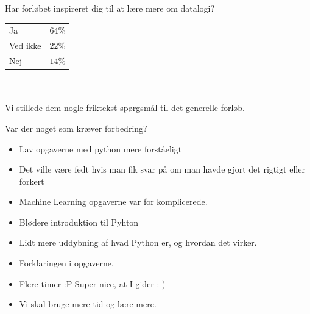 \documentclass{article}
\begin{document}
            \begin{minipage}[t]{0.5\textwidth}
                Har forløbet inspireret dig til at lære mere om datalogi?
                \begin{center}
                    \begin{tabular}{| l | c |}
                        \hline
                        Ja         & $64\%$ \\
                        Ved ikke   & $22\%$ \\
                        Nej        & $14\%$ \\  \hline
                    \end{tabular}
                \end{center}
            \end{minipage} \\~\\

            Vi stillede dem nogle friktekst spørgsmål til det generelle forløb.

            \begin{center}
                \large{Var der noget som kræver forbedring?}
            \end{center}
            \begin{itemize}
                \item Lav opgaverne med python mere forståeligt
                \item Det ville være fedt hvis man fik svar på om man havde gjort
                      det rigtigt eller forkert
                \item Machine Learning opgaverne var for komplicerede.
                \item Blødere introduktion til Pyhton
                \item Lidt mere uddybning af hvad Python er, og hvordan det virker.
                \item Forklaringen i opgaverne.
                \item Flere timer :P Super nice, at I gider :-)
                \item Vi skal bruge mere tid og lære mere.
            \end{itemize}
\end{document}
